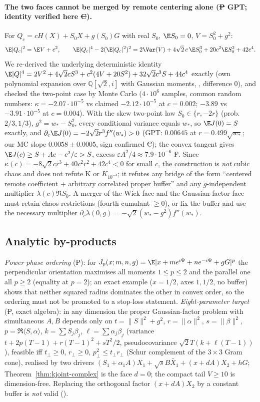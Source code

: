 \paragraph{The two faces cannot be merged by remote centering alone (\st{P} GPT; identity verified here \st{C}).} For $Q_c=cH(X)+S_0X+g(S_0)G$ with real $S_0$,
$\E S_0=0$, $V=S_0^2+g^2$:
\[
\E|Q_c|^2=\E V+c^2,\qquad
\E|Q_c|^4-2(\E|Q_c|^2)^2=2\Var(V)+4\sqrt2\,c\,\E S_0^3+20c^2\E S_0^2+42c^4 .
\]
We re-derived the underlying deterministic identity $\E|Q|^4=2V^2+4\sqrt2cS^3+c^2(4V+20S^2)+32\sqrt2c^3S+44c^4$ exactly (own polynomial expansion over $\mathbb Q[\sqrt2,i]$ with
Gaussian moments, , difference $0$), and checked the two-point case by Monte Carlo ($4\cdot10^6$ samples, common random numbers:
$\kappa=-2.07\cdot10^{-5}$ vs claimed $-2.12\cdot10^{-5}$ at $c=0.002$; $-3.89$ vs $-3.91\cdot10^{-5}$ at $c=0.004$). With the skew two-point law $S_0\in\{r,-2r\}$ (prob.\ $2/3,1/3$),
$g^2=w_*-S_0^2$, every conditional variance equals $w_*$, so $\E J(0)=S$ exactly, and $\partial_c\E J(0)=-2\sqrt2r^3f''(w_*)>0$ (GPT: $0.00645$ at $r=0.499\sqrt{w_*}$; our MC
slope $0.0058\pm0.0005$, sign confirmed \st{C}); the convex tangent gives $\E J(c)\ge S+Ac-c^2/\varepsilon>S$, excess $\varepsilon A^2/4\approx7.9\cdot10^{-6}$ \st{F}. Since
$\kappa(c)=-8\sqrt2cr^3+40c^2r^2+42c^4<0$ for small $c$, the construction is \emph{not} cubic chaos and does not refute K or $K_{10^{-4}}$; it refutes any bridge of the form
``centered remote coefficient + arbitrary correlated proper buffer'' and any $g$-independent multiplier $\lambda(c)\Re S_0$. A merger of the Wick face and the Gaussian-factor
face must retain chaos restrictions (fourth cumulant $\ge0$), or fix the buffer and use the necessary multiplier $\partial_c\lambda(0,g)=-\sqrt2(w_*-g^2)f''(w_*)$.

\subsection{Analytic by-products}
\emph{Power phase ordering} (\st{P}): for $J_p(x;m,n,g)=\E|x+me^{i\Psi}+ne^{-i\Psi}+gG|^p$ the perpendicular orientation maximises all moments $1\le p\le2$ and the parallel one all
$p\ge2$ (equality at $p=2$); an exact example ($x=1/2$, axes $1,1/2$, no buffer) shows that neither squared radius dominates the other in convex order, so the ordering must not
be promoted to a stop-loss statement. \emph{Eight-parameter target} (\st{P}, exact algebra): in any dimension the proper Gaussian-factor problem with simultaneous $A,B$ depends only
on $t=\|S\|^2+g^2$, $r=\|\alpha\|^2$, $s=\|\beta\|^2$, $p=\Re\langle S,\alpha\rangle$, $k=\sum S_j\beta_j$, $\ell=\sum\alpha_j\beta_j$ (variance $t+2p(T-1)+r(T-1)^2+sT^2/2$,
pseudocovariance $\sqrt2T(k+\ell(T-1))$), feasible iff $t_\perp\ge0$, $r_\perp\ge0$, $p_\perp^2\le t_\perp r_\perp$ (Schur complement of the $3\times3$ Gram cone), realised by two drivers
$(S_1+\alpha_1A)X_1+\sqrt sB\bar X_1+(x+dA)X_2+hG$; Theorem~\ref{thm:kjoint-complex} is the face $d=0$; the compact tail $V\ge10$ is dimension-free. Replacing the orthogonal factor
$(x+dA)X_2$ by a constant buffer is \emph{not} valid ().


